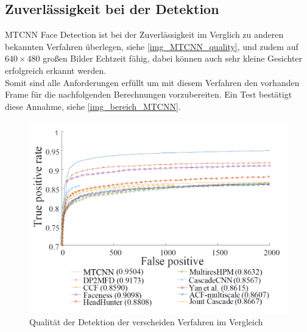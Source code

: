 \subsection{Zuverlässigkeit bei der Detektion}
MTCNN Face Detection ist bei der Zuverlässigkeit im Verglich zu anderen bekannten Verfahren überlegen, siehe \autoref{img_MTCNN_quality}, und zudem auf $640\times 480$ großen Bilder Echtzeit fähig, dabei können auch sehr kleine Gesichter erfolgreich erkannt werden.\\
Somit sind alle Anforderungen erfüllt um mit diesem Verfahren den vorhanden Frame für die nachfolgenden Berechnungen vorzubereiten. Ein Test bestätigt diese Annahme, siehe \autoref{img_bereich_MTCNN}.
\begin{figure}
	\centering
	\includegraphics[width=0.7\linewidth]{img/MTCNN_quality}
	\caption{Qualität der Detektion der verscheiden Verfahren im Vergleich \cite{MTCCN}}
	\label{img_MTCNN_quality}
\end{figure}
